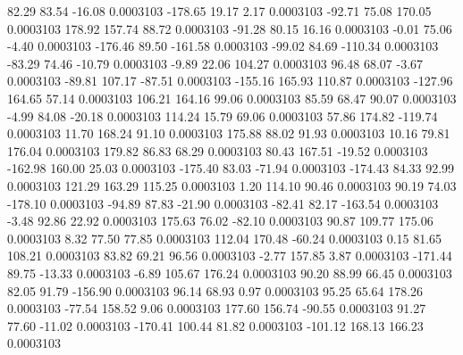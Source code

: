        82.29       83.54      -16.08     0.0003103
     -178.65       19.17        2.17     0.0003103
      -92.71       75.08      170.05     0.0003103
      178.92      157.74       88.72     0.0003103
      -91.28       80.15       16.16     0.0003103
       -0.01       75.06       -4.40     0.0003103
     -176.46       89.50     -161.58     0.0003103
      -99.02       84.69     -110.34     0.0003103
      -83.29       74.46      -10.79     0.0003103
       -9.89       22.06      104.27     0.0003103
       96.48       68.07       -3.67     0.0003103
      -89.81      107.17      -87.51     0.0003103
     -155.16      165.93      110.87     0.0003103
     -127.96      164.65       57.14     0.0003103
      106.21      164.16       99.06     0.0003103
       85.59       68.47       90.07     0.0003103
       -4.99       84.08      -20.18     0.0003103
      114.24       15.79       69.06     0.0003103
       57.86      174.82     -119.74     0.0003103
       11.70      168.24       91.10     0.0003103
      175.88       88.02       91.93     0.0003103
       10.16       79.81      176.04     0.0003103
      179.82       86.83       68.29     0.0003103
       80.43      167.51      -19.52     0.0003103
     -162.98      160.00       25.03     0.0003103
     -175.40       83.03      -71.94     0.0003103
     -174.43       84.33       92.99     0.0003103
      121.29      163.29      115.25     0.0003103
        1.20      114.10       90.46     0.0003103
       90.19       74.03     -178.10     0.0003103
      -94.89       87.83      -21.90     0.0003103
      -82.41       82.17     -163.54     0.0003103
       -3.48       92.86       22.92     0.0003103
      175.63       76.02      -82.10     0.0003103
       90.87      109.77      175.06     0.0003103
        8.32       77.50       77.85     0.0003103
      112.04      170.48      -60.24     0.0003103
        0.15       81.65      108.21     0.0003103
       83.82       69.21       96.56     0.0003103
       -2.77      157.85        3.87     0.0003103
     -171.44       89.75      -13.33     0.0003103
       -6.89      105.67      176.24     0.0003103
       90.20       88.99       66.45     0.0003103
       82.05       91.79     -156.90     0.0003103
       96.14       68.93        0.97     0.0003103
       95.25       65.64      178.26     0.0003103
      -77.54      158.52        9.06     0.0003103
      177.60      156.74      -90.55     0.0003103
       91.27       77.60      -11.02     0.0003103
     -170.41      100.44       81.82     0.0003103
     -101.12      168.13      166.23     0.0003103
